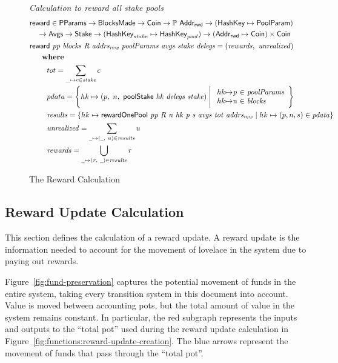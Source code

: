 \begin{figure}[htb]
  \emph{Calculation to reward all stake pools}
  \begin{align*}
      & \fun{reward} \in \PParams \to \BlocksMade \to \Coin\to \powerset{\AddrRWD}
      \to (\HashKey \mapsto \PoolParam) \\
      & ~~~\to \Avgs \to \Stake \to (\HashKey_{stake} \mapsto \HashKey_{pool}) \to
      (\AddrRWD \mapsto \Coin)\times\Coin\\
      & \reward{pp}{blocks}{R}{addrs_{rew}}{poolParams}{avgs}{stake}{delegs}
          = (\var{rewards},~\var{unrealized})\\
      & ~~~\where \\
      & ~~~~~~~tot = \sum_{\_\mapsto c\in \var{stake}}c \\
      & ~~~~~~~pdata = \left\{
        hk\mapsto \left(p,~n,~\poolStake{hk}{delegs}{stake}\right)
        \mathrel{\Bigg|}
        \begin{array}{r@{\mapsto}c@{~\in~}l}
          hk & \var{p} & \var{poolParams} \\
          hk & \var{n} & \var{blocks} \\
        \end{array}
      \right\} \\
      & ~~~~~~~\var{results} = \left\{
        hk \mapsto \rewardOnePool{pp}{R}{n}{hk}{p}{s}{avgs}{tot}{addrs_{rew}}
                 \mid
                 hk\mapsto(p, n, s)\in\var{pdata} \right\} \\
      & ~~~~~~~\var{unrealized} = \sum_{\wcard\mapsto (\wcard,~u)\in\var{results}}u \\
      & ~~~~~~~\var{rewards} = \bigcup_{\wcard\mapsto(\var{r},~\wcard)\in\var{results}}\var{r}
  \end{align*}
  \caption{The Reward Calculation}
  \label{fig:functions:reward-calc}
\end{figure}

\clearpage

\subsection{Reward Update Calculation}
\label{sec:reward-calc}

This section defines the calculation of a reward update.
A reward update is the information needed to account for the movement of lovelace
in the system due to paying out rewards.

Figure~\ref{fig:fund-preservation} captures the potential movement of funds in the entire system,
taking every transition system in this document into account.  Value is moved between
accounting pots, but the total amount of value in the system remains constant.
In particular, the red subgraph represents the inputs and outputs to
the ``total pot'' used during the reward update calculation in
Figure~\ref{fig:functions:reward-update-creation}.
The blue arrows represent the movement of funds that pass through the ``total pot''.


